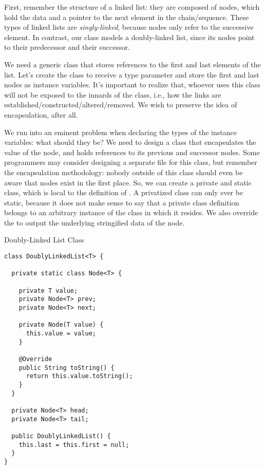 
First, remember the structure of a linked list: they are composed of nodes, which hold the data and a pointer to the next element in the chain/sequence. These types of linked lists are \textit{singly-linked}, because nodes only refer to the successive element. In contrast, our class models a doubly-linked list, since its nodes point to their predecessor and their successor. 

We need a generic class that stores references to the first and last elements of the list. Let's create the  class to receive a type parameter  and store the first and last nodes as instance variables. It's important to realize that, whoever uses this class will not be exposed to the innards of the class, i.e., how the links are established/constructed/altered/removed. We wish to preserve the idea of encapsulation, after all.

We run into an eminent problem when declaring the types of the instance variables: what should they be? We need to design a class that encapsulates the value of the node, and holds references to its previous and successor nodes. Some programmers may consider designing a separate  file for this class, but remember the encapsulation methodology: nobody outside of this class should even be aware that nodes exist in the first place. So, we can create a private and static  class, which is local to the definition of . A privatized class can only ever be static, because it does not make sense to say that a private class definition belongs to an arbitrary instance of the class in which it resides. We also override the  to output the underlying stringified data of the node.

\begin{cl}[]{Doubly-Linked List Class}
\begin{lstlisting}[language=MyJava]
class DoublyLinkedList<T> {

  private static class Node<T> {

    private T value;
    private Node<T> prev;
    private Node<T> next;

    private Node(T value) { 
      this.value = value; 
    }

    @Override
    public String toString() {
      return this.value.toString();
    }
  }

  private Node<T> head;
  private Node<T> tail;

  public DoublyLinkedList() {
    this.last = this.first = null;
  }
}
\end{lstlisting}
\end{cl}

